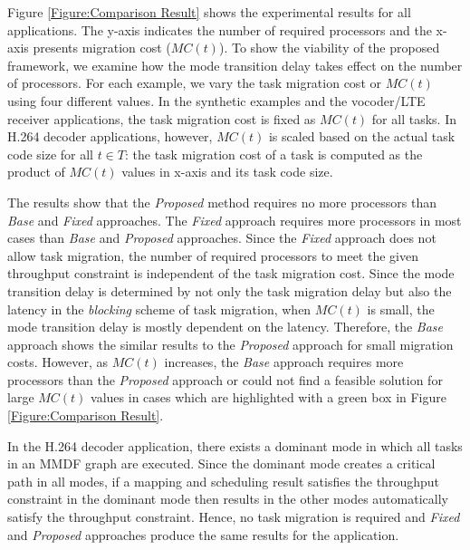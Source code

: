 \documentclass[prodmode,acmtecs]{acmsmall}
\begin{document}
Figure \ref{Figure:Comparison Result} shows the experimental results for all applications. The y-axis indicates the number of required processors and the x-axis presents migration cost ($MC(t)$). To show the viability of the proposed framework, we examine how the mode transition delay takes effect on the number of processors. For each example, we vary the task migration cost or $MC(t)$ using four different values. In the synthetic examples and the vocoder/LTE receiver applications, the task migration cost is fixed as $MC(t)$ for all tasks. In H.264 decoder applications, however, $MC(t)$ is scaled based on the actual task code size for all $t \in T$: the task migration cost of a task is computed as the product of $MC(t)$ values in x-axis and its task code size.

The results show that the \textit{Proposed} method requires no more processors than \textit{Base} and \textit{Fixed} approaches. The \textit{Fixed} approach requires more processors in most cases than \textit{Base} and \textit{Proposed} approaches. Since the \textit{Fixed} approach does not allow task migration, the number of required processors to meet the given throughput constraint is independent of the task migration cost. Since the mode transition delay is determined by not only the task migration delay but also the latency in the \textit{blocking} scheme of task migration, when $MC(t)$ is small, the mode transition delay is mostly dependent on the latency. Therefore, the \textit{Base} approach shows the similar results to the \textit{Proposed} approach for small migration costs. However, as $MC(t)$ increases, the \textit{Base} approach requires more processors than the \textit{Proposed} approach or could not find a feasible solution for large $MC(t)$ values in cases which are highlighted with a green box in Figure \ref{Figure:Comparison Result}.

In the H.264 decoder application, there exists a dominant mode in which all tasks in an MMDF graph are executed. Since the dominant mode creates a critical path in all modes, if a mapping and scheduling result satisfies the throughput constraint in the dominant mode then results in the other modes automatically satisfy the throughput constraint. Hence, no task migration is required and \textit{Fixed} and \textit{Proposed} approaches produce the same results for the application.
\end{document}

